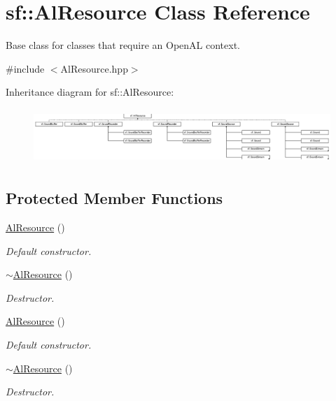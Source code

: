 \hypertarget{classsf_1_1_al_resource}{\section{sf\-:\-:Al\-Resource Class Reference}
\label{classsf_1_1_al_resource}
}


Base class for classes that require an Open\-A\-L context.  




{\ttfamily \#include $<$Al\-Resource.\-hpp$>$}

Inheritance diagram for sf\-:\-:Al\-Resource\-:\begin{figure}[H]
\begin{center}
\leavevmode
\includegraphics[height=2.100000cm]{classsf_1_1_al_resource}
\end{center}
\end{figure}
\subsection*{Protected Member Functions}
\begin{DoxyCompactItemize}
\item 
\hyperlink{classsf_1_1_al_resource_a51b4f3a825c5d68386f8683e3e1053d7}{Al\-Resource} ()
\begin{DoxyCompactList}\small\item\em Default constructor. \end{DoxyCompactList}\item 
\hyperlink{classsf_1_1_al_resource_a74ad78198cddcb6e5d847177364049db}{$\sim$\-Al\-Resource} ()
\begin{DoxyCompactList}\small\item\em Destructor. \end{DoxyCompactList}\item 
\hyperlink{classsf_1_1_al_resource_a51b4f3a825c5d68386f8683e3e1053d7}{Al\-Resource} ()
\begin{DoxyCompactList}\small\item\em Default constructor. \end{DoxyCompactList}\item 
\hyperlink{classsf_1_1_al_resource_a74ad78198cddcb6e5d847177364049db}{$\sim$\-Al\-Resource} ()
\begin{DoxyCompactList}\small\item\em Destructor. \end{DoxyCompactList}\end{DoxyCompactItemize}


